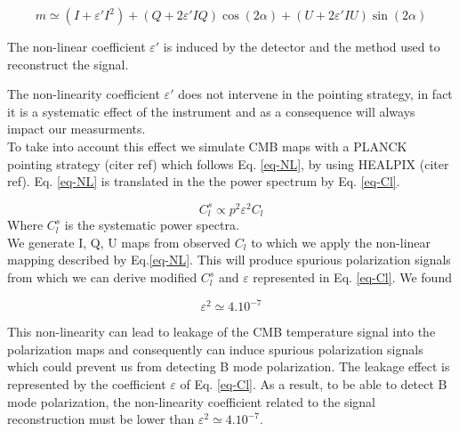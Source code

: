\begin{equation}
m  \simeq (I + \varepsilon' I^{2}) + (Q + 2\varepsilon' IQ) \cos(2\alpha) + (U + 2 \varepsilon' IU) \sin(2\alpha)
\label{eq-NL}
\end{equation}

The non-linear coefficient $\varepsilon'$ is induced by the detector and the method used to reconstruct the signal.


The non-linearity coefficient $\varepsilon'$ does not intervene in the pointing strategy, in fact it is a systematic effect of the instrument and as a consequence will always impact our measurments. \\
To take into account this effect we simulate CMB maps with a PLANCK pointing strategy (citer ref) which follows Eq. \ref{eq-NL}, by using HEALPIX (citer ref).
Eq. \ref{eq-NL} is translated in the the power spectrum by Eq. \ref{eq-Cl}.

\begin{equation}
C_{l}^{s} \propto p^{2} \varepsilon^{2} C_{l}
\label{eq-Cl}
\end{equation}
Where $C_{l}^{s}$ is the systematic power spectra.\\

We generate I, Q, U maps from observed $C_{l}$ to which we apply the non-linear mapping described by Eq.\ref{eq-NL}. This will produce spurious polarization signals from which we can derive modified $C_{l}^{s}$ and $\varepsilon$ represented in Eq. \ref{eq-Cl}. We found 

\begin{equation}
\varepsilon^{2} \simeq 4.10^{-7}
\label{epsilon}
\end{equation}

This non-linearity can lead to leakage of the CMB temperature signal into the polarization maps and consequently can induce spurious polarization signals which could prevent us from detecting B mode polarization. The leakage effect is represented by the coefficient $\varepsilon$ of Eq. \ref{eq-Cl}. As a result, to be able to detect B mode polarization, the non-linearity coefficient related to the signal reconstruction must be lower than $\varepsilon^{2} \simeq 4.10^{-7}$.


